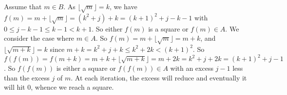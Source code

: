 \documentclass{article}
\begin{document}
\begin{enumerate}
{Assume that $m \in B$. As $\lfloor \sqrt{m} \rfloor = k$, we have $f(m) = m + \lfloor \sqrt{m} \rfloor = (k^2 + j) + k = {(k + 1)}^2 + j - k - 1$ with $0 \leq j - k - 1 \leq k  - 1 < k + 1$. So either $f(m)$ is a square or $f(m) \in A$. 
We consider the case where $m \in A$. So $f(m) = m + \lfloor \sqrt{m} \rfloor = m + k$, and $\lfloor \sqrt{m + k} \rfloor = k$ since $m + k = k^2 + j + k \leq k^2 + 2k < {(k + 1)}^2$. So $f(f(m)) = f(m + k) = m + k + \lfloor \sqrt{m + k} \rfloor = m + 2k = k^2 + j + 2k = {(k + 1)}^2 + j - 1$. So $f(f(m))$ is either a square or $f(f(m)) \in A$ with an excess $j - 1$ less than the excess $j$ of $m$. At each iteration, the excess will reduce and eventually it will hit $0$, whence we reach a square.}

\end{enumerate}
\end{document}
